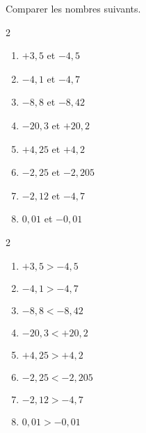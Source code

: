 \begin{exercice*}
    Comparer les nombres suivants.
    \begin{multicols}2
        \begin{enumerate}
            \item $+3,5$ et $-4,5$
            \item $-4,1$ et $-4,7$
            \item $-8,8$ et $-8,42$
            \item $-20,3$ et $+20,2$
            \item $+4,25$ et $+4,2$
            \item $-2,25$ et $-2,205$
            \item $-2,12$ et $-4,7$
            \item $0,01$ et $-0,01$
        \end{enumerate}
    \end{multicols}
\end{exercice*}
\begin{corrige}
    \phantom{rrr}    
    \begin{multicols}2
        \begin{enumerate}
            \item $+3,5>-4,5$
            \item $-4,1>-4,7$
            \item $-8,8<-8,42$
            \item $-20,3<+20,2$
            \item $+4,25>+4,2$
            \item $-2,25<-2,205$
            \item $-2,12>-4,7$
            \item $0,01>-0,01$
        \end{enumerate}    
    \end{multicols}
\end{corrige}